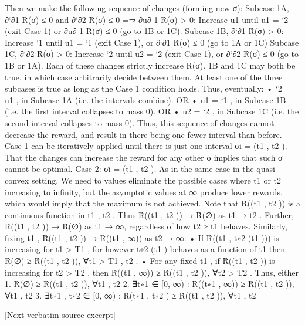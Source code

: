 \documentclass[10pt]{article}
\begin{document}
\begin{ReviewVerbatim}
Then we make the following sequence of changes (forming new σ):
Subcase 1A, ∂`∂1 R̂(σ) ≤ 0 and ∂`∂2 R̂(σ) ≤ 0 =⇒ ∂u∂ 1 R̂(σ) > 0: Increase u1 until u1 = `2 (exit
Case 1) or ∂u∂ 1 R̂(σ) ≤ 0 (go to 1B or 1C).
Subcase 1B, ∂`∂1 R̂(σ) > 0: Increase `1 until u1 = `1 (exit Case 1), or ∂`∂1 R̂(σ) ≤ 0 (go to 1A or
1C)
Subcase 1C, ∂`∂2 R̂(σ) > 0: Increase `2 until u2 = `2 (exit Case 1), or ∂`∂2 R̂(σ) ≤ 0 (go to 1B or
1A).
Each of these changes strictly increase R(σ). 1B and 1C may both be true, in which case arbitrarily
decide between them. At least one of the three subcases is true as long as the Case 1 condition
holds. Thus, eventually:
• `2 = u1 , in Subcase 1A (i.e. the intervals combine). OR
• u1 = `1 , in Subcase 1B (i.e. the first interval collapses to mass 0). OR
• u2 = `2 , in Subcase 1C (i.e. the second interval collapses to mass 0).
Thus, this sequence of changes cannot decrease the reward, and result in there being one fewer
interval than before. Case 1 can be iteratively applied until there is just one interval σi = (t1 , t2 ).
That the changes can increase the reward for any other σ implies that such σ cannot be optimal.
Case 2: σi = (t1 , t2 ). As in the same case in the quasi-convex setting. We need to values eliminate
the possible cases where t1 or t2 increasing to infinity, but the asymptotic values at ∞ produce
lower rewards, which would imply that the maximum is not achieved.
Note that R̂((t1 , t2 )) is a continuous function in t1 , t2 . Thus R̂((t1 , t2 )) → R̂(∅) as t1 → t2 .
Further, R̂((t1 , t2 )) → R̂(∅) as t1 → ∞, regardless of how t2 ≥ t1 behaves. Similarly, fixing t1 ,
R̂((t1 , t2 )) → R̂((t1 , ∞)) as t2 → ∞.
• If R̂((t1 , t∗2 (t1 ))) is increasing for t1 > T1 , for however t∗2 (t1 ) behaves as a function of t1 then
R̂(∅) ≥ R̂((t1 , t2 )), ∀t1 > T1 , t2 .
• For any fixed t1 , if R̂((t1 , t2 )) is increasing for t2 > T2 , then R̂((t1 , ∞)) ≥ R̂((t1 , t2 )), ∀t2 > T2 .
Thus, either
1. R̂(∅) ≥ R̂((t1 , t2 )), ∀t1 , t2
2. ∃t∗1 ∈ [0, ∞) : R̂((t∗1 , ∞)) ≥ R̂((t1 , t2 )), ∀t1 , t2
3. ∃t∗1 , t∗2 ∈ [0, ∞) : R̂(t∗1 , t∗2 ) ≥ R̂((t1 , t2 )), ∀t1 , t2

[Next verbatim source excerpt]


\end{ReviewVerbatim}
\end{document}

